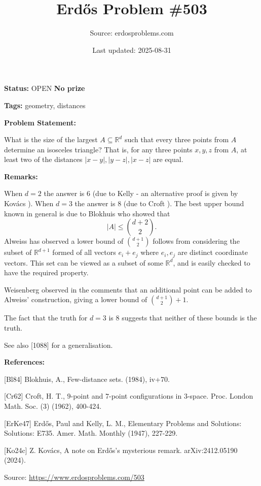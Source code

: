 \documentclass{article}
\title{Erd\H{o}s Problem \#503}
\date{Last updated: 2025-08-31}
\author{Source: erdosproblems.com}
\begin{document}
\maketitle

\noindent\textbf{Status:} OPEN \quad \textbf{No prize}

\noindent\textbf{Tags:} geometry, distances

\medskip
\noindent\textbf{Problem Statement:}

What is the size of the largest $A\subseteq \mathbb{R}^d$ such that every three points from $A$ determine an isosceles triangle? That is, for any three points $x,y,z$ from $A$, at least two of the distances $\lvert x-y\rvert,\lvert y-z\rvert,\lvert x-z\rvert$ are equal.

\bigskip
\noindent\textbf{Remarks:}

When $d=2$ the answer is $6$ (due to Kelly \cite{ErKe47} - an alternative proof is given by Kov\'{a}cs \cite{Ko24c}). When $d=3$ the answer is $8$ (due to Croft \cite{Cr62}). The best upper bound known in general is due to Blokhuis \cite{Bl84} who showed that\[\lvert A\rvert \leq \binom{d+2}{2}.\]Alweiss has observed a lower bound of $\binom{d+1}{2}$ follows from considering the subset of $\mathbb{R}^{d+1}$ formed of all vectors $e_i+e_j$ where $e_i,e_j$ are distinct coordinate vectors. This set can be viewed as a subset of some $\mathbb{R}^d$, and is easily checked to have the required property.

Weisenberg observed in the comments that an additional point can be added to Alweiss' construction, giving a lower bound of $\binom{d+1}{2}+1$.

The fact that the truth for $d=3$ is $8$ suggests that neither of these bounds is the truth.

See also [1088] for a generalisation.

\bigskip
\noindent\textbf{References:}

[Bl84] Blokhuis, A., Few-distance sets. (1984), iv+70.
 
 [Cr62] Croft, H. T., $9$-point and $7$-point configurations in $3$-space. Proc. London Math. Soc. (3) (1962), 400-424.
 
 [ErKe47] Erd\H{o}s, Paul and Kelly, L. M., Elementary Problems and Solutions: Solutions: E735. Amer. Math. Monthly (1947), 227-229.
 
 [Ko24c] Z. Kov\'{a}cs, A note on Erd\H{o}s's mysterious remark. arXiv:2412.05190 (2024).

\bigskip
\noindent\small{Source: \url{https://www.erdosproblems.com/503}}
\end{document}
